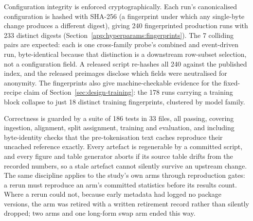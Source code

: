 Configuration integrity is enforced cryptographically. Each run's canonicalised configuration is hashed with SHA-256 (a fingerprint under which any single-byte change produces a different digest), giving 240 fingerprinted production runs with 233 distinct digests (Section~\ref{app:hyperparams:fingerprints}). %
The 7 colliding pairs are expected: each is one cross-family probe's combined and event-driven run, byte-identical because that distinction is a downstream row-subset selection, not a configuration field. %
A released script re-hashes all 240 against the published index, and the released preimages disclose which fields were neutralised for anonymity. %
The fingerprints also give machine-checkable evidence for the fixed-recipe claim of Section~\ref{sec:design-training}: the 178 runs carrying a training block collapse to just 18 distinct training fingerprints, clustered by model family. %

Correctness is guarded by a suite of 186 tests in 33 files, all passing, covering ingestion, alignment, split assignment, training and evaluation, and including byte-identity checks that the pre-tokenisation text caches reproduce their uncached reference exactly. %
Every artefact is regenerable by a committed script, and every figure and table generator aborts if its source table drifts from the recorded numbers, so a stale artefact cannot silently survive an upstream change. %
The same discipline applies to the study's own arms through reproduction gates: a rerun must reproduce an arm's committed statistics before its results count. Where a rerun could not, because early metadata had logged no package versions, the arm was retired with a written retirement record rather than silently dropped; two arms and one long-form swap arm ended this way. %

